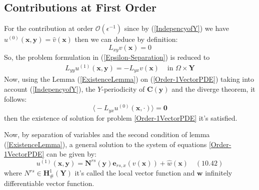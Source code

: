 \subsection{Contributions at First Order}
For the contribution at order $\mathcal{O}(\epsilon^{-1})$ since by (\ref{IndepencyofY}) we have $u^{(0)}(\mathbf{x},\mathbf{y}) = \hat{v}(\mathbf{x})$ then we can deduce by definition:
\begin{equation*}
    L_{xy} v(\mathbf{x}) = 0
\end{equation*}
So, the problem formulation in (\ref{Epsilon-Separation}) is reduced to
\begin{equation*}
    \label{Order-1VectorPDE}
    \begin{array}{cc}
        L_{yy} u^{(1)}(\mathbf{x},\mathbf{y}) = - L_{yx} v(\mathbf{x}) & \text{ in } \Omega \times \mathbf{Y}
    \end{array}
\end{equation*}
Now, using the Lemma (\ref{ExistenceLemma}) on (\ref{Order-1VectorPDE}) taking into account (\ref{IndepencyofY}), the $Y$-periodicity of $\mathbf{C}(\mathbf{y})$ and the diverge theorem, it follows:
\begin{equation*}
    \big\langle - L_{yx} u^{(0)}(\mathbf{x}, \cdot) \big\rangle = \mathbf{0}
\end{equation*}
then the existence of solution for problem \ref{Order-1VectorPDE} it's satisfied.

Now, by separation of variables and the second condition of lemma (\ref{ExistenceLemma}), a general solution to the system of equations \ref{Order-1VectorPDE} can be given by:
\begin{equation}
    \label{Order-1Ansatz}
    u^{(1)}(\mathbf{x},\mathbf{y}) = \mathbf{N}^{rs}(\mathbf{y}) \mathbf{e}_{rs,x}(v(\mathbf{x})) + \hat{w}(\mathbf{x}) \quad (10.42)
\end{equation}
where $N^{rs} \in \mathbf{H}^1_{\#}(\mathbf{Y})$ it's called the local vector function and $\mathbf{w}$ infinitely differentiable vector function.

